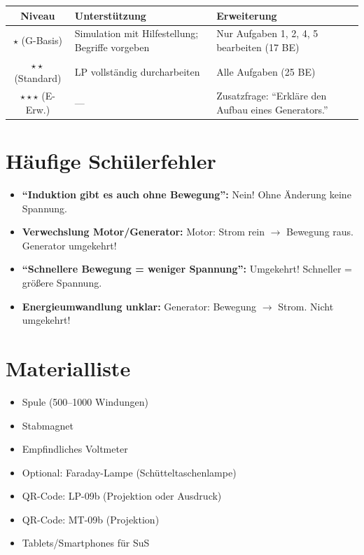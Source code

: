 \documentclass[a4paper,11pt]{article}
\begin{document}
\begin{tabularx}{\textwidth}{|c|X|X|}
\hline
\textbf{Niveau} & \textbf{Unterstützung} & \textbf{Erweiterung} \\
\hline
$\star$ (G-Basis) &
Simulation mit Hilfestellung; Begriffe vorgeben &
Nur Aufgaben 1, 2, 4, 5 bearbeiten (17 BE) \\
\hline
$\star\star$ (Standard) &
LP vollständig durcharbeiten &
Alle Aufgaben (25 BE) \\
\hline
$\star\star\star$ (E-Erw.) &
--- &
Zusatzfrage: ``Erkläre den Aufbau eines Generators.'' \\
\hline
\end{tabularx}

\vspace{5mm}

\section*{Häufige Schülerfehler}

\begin{itemize}[noitemsep]
    \item \textbf{``Induktion gibt es auch ohne Bewegung'':} Nein! Ohne Änderung keine Spannung.
    \item \textbf{Verwechslung Motor/Generator:} Motor: Strom rein $\rightarrow$ Bewegung raus. Generator umgekehrt!
    \item \textbf{``Schnellere Bewegung = weniger Spannung'':} Umgekehrt! Schneller = größere Spannung.
    \item \textbf{Energieumwandlung unklar:} Generator: Bewegung $\rightarrow$ Strom. Nicht umgekehrt!
\end{itemize}

\vspace{5mm}

\section*{Materialliste}

\begin{itemize}[noitemsep]
    \item[$\square$] Spule (500--1000 Windungen)
    \item[$\square$] Stabmagnet
    \item[$\square$] Empfindliches Voltmeter
    \item[$\square$] Optional: Faraday-Lampe (Schütteltaschenlampe)
    \item[$\square$] QR-Code: LP-09b (Projektion oder Ausdruck)
    \item[$\square$] QR-Code: MT-09b (Projektion)
    \item[$\square$] Tablets/Smartphones für SuS
\end{itemize}
\end{document}
